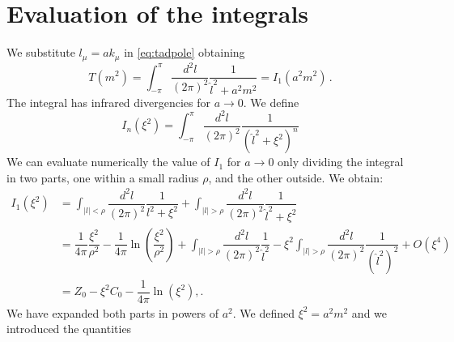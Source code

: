 \documentclass[12pt,a4paper]{report}
\begin{document}
 \section{Evaluation of the integrals}
 
 We substitute $l_\mu = a k_\mu$ in \eqref{eq:tadpole} obtaining \begin{equation}
 T( m^2) =  \int_{-\pi}^\pi \dfrac{d^2l}{(2 \pi)^2}\dfrac{1}{\hat l^2 + a^2m^2} =  I_1(a^2 m^2) \,.
 \end{equation} The integral has infrared divergencies for $a \to 0$. We define \begin{equation}
 I_n(\xi^2) = \int_{-\pi}^\pi \dfrac{d^2l}{(2 \pi)^2}\dfrac{1}{(\hat l^2 + \xi^2)^n}
\end{equation}  We can evaluate numerically the value of $I_1$ for $a\to 0$ only dividing the integral in two parts, one within a small radius $\rho$, and the other outside.
 We obtain:
 \begin{align}
 I_1(\xi^2) &= \int_{|l|< \rho} \dfrac{d^2l}{(2 \pi)^2} \dfrac{1}{l^2 + \xi^2} +\int_{|l|> \rho} \dfrac{d^2l}{(2 \pi)^2} \dfrac{1}{\hat l^2 + \xi^2}  \\
 &= \dfrac{1}{4 \pi} \dfrac{\xi^2}{\rho^2} - \dfrac{1}{4 \pi} \ln \left( \dfrac{\xi^2}{\rho^2}\right) + \int_{|l|> \rho} \dfrac{d^2l}{(2 \pi)^2} \dfrac{1}{\hat l^2 } - \xi^2 \int_{|l|> \rho} \dfrac{d^2l}{(2 \pi)^2} \dfrac{1}{(\hat l^2)^2}  +O(\xi^4) \nonumber \\
 &= Z_0 -\xi^2 C_0 -\dfrac{1}{4 \pi} \ln(\xi^2) ,. \nonumber
 \end{align} We have expanded both parts in powers of $a^2$. We defined $\xi^2 = a^2 m^2$ and we introduced the quantities
\end{document}
